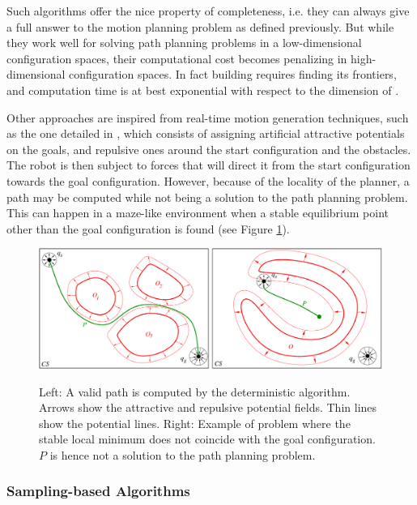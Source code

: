 Such algorithms offer the nice property of completeness, i.e. they can
always give a full answer to the motion planning problem as defined
previously. But while they work well for solving path planning
problems in a low-dimensional configuration spaces, their
computational cost becomes penalizing in high-dimensional
configuration spaces. In fact building \cfree requires finding its
frontiers, and computation time is at best exponential with respect to
the dimension of \cspace.

Other approaches are inspired from real-time motion generation
techniques, such as the one detailed in \cite{khat85}, which consists
of assigning artificial attractive potentials on the goals, and
repulsive ones around the start configuration and the obstacles. The
robot is then subject to forces that will direct it from the start
configuration towards the goal configuration. However, because of the
locality of the planner, a path may be computed while not being a
solution to the path planning problem. This can happen in a maze-like
environment when a stable equilibrium point other than the goal
configuration is found (see Figure
\ref{fig:chap1-deterministic-algorithm}).

\begin{figure}
  \centering
      {\includegraphics[width = \linewidth]
        {src/chap1-path-optimization/deterministic-algorithm.pdf}}
      \caption{Left: A valid path is computed by the deterministic
        algorithm. Arrows show the attractive and repulsive potential
        fields. Thin lines show the potential lines. Right: Example of
        problem where the stable local minimum does not coincide with
        the goal configuration. $P$ is hence not a solution to the
        path planning problem.}
      \label{fig:chap1-deterministic-algorithm}
\end{figure}

\subsubsection{Sampling-based Algorithms}
\label{subsubsec:chap1-sampling-algorithms}

